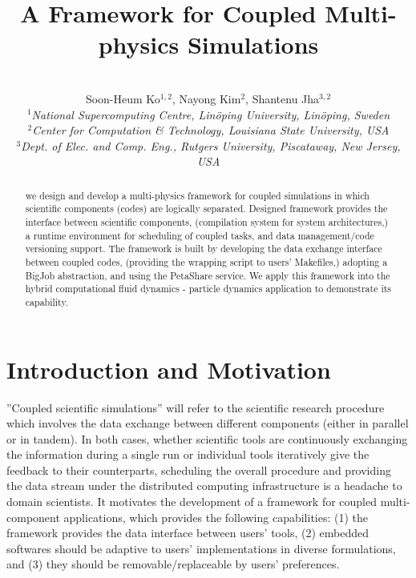 \documentclass[10pt,conference]{IEEEtran}
\title{A Framework for Coupled Multi-physics Simulations \skonote{some charming title?? 
emphasizing ''it can cover various kinds of applications in different requirement, 
main components can be replaced by other similar softwares, etc.''} }
\author{
 ~\\[-2em]
 Soon-Heum Ko$^{1,2}$, Nayong Kim$^{2}$, Shantenu Jha$^{3,2}$\\
 \small{\emph{$^{1}$National Supercomputing Centre, Lin\"{o}ping University, Lin\"{o}ping, Sweden}}\\
 \small{\emph{$^{2}$Center for Computation \& Technology, Louisiana State University, USA}}\\
 \small{\emph{$^{3}$Dept. of Elec. and Comp. Eng., Rutgers University, Piscataway, New Jersey, USA}}\\
}
\newcommand{\up}{\vspace*{-1em}}
\begin{document}
\maketitle

\begin{abstract}
we design and develop a multi-physics framework for coupled simulations
in which scientific components (codes) are logically separated.
Designed framework provides the interface between scientific components,
(compilation system for system architectures,)
a runtime environment for scheduling of coupled tasks, and
data management/code versioning support.
The framework is built by developing the data exchange interface 
between coupled codes, (providing the wrapping script to users' Makefiles,)
adopting a BigJob abstraction, and using the PetaShare service.
We apply this framework into the hybrid computational fluid dynamics -
particle dynamics application to demonstrate its capability.
\end{abstract}
\up\up

\section{Introduction and Motivation}

''Coupled scientific simulations'' will refer to the scientific 
research procedure which involves the data exchange between
different components (either in parallel or in tandem). In both cases,
whether scientific tools are continuously exchanging the information 
during a single run or individual tools iteratively give the feedback
to their counterparts, scheduling the overall procedure and
providing the data stream under the distributed computing infrastructure
is a headache to domain scientists. It motivates the development of
a framework for coupled multi-component applications,
which provides the following capabilities:
(1) the framework provides the data interface between users' tools,
(2) embedded softwares should be adaptive to users' implementations 
in diverse formulations, and 
(3) they should be removable/replaceable by users' preferences.
\end{document}
